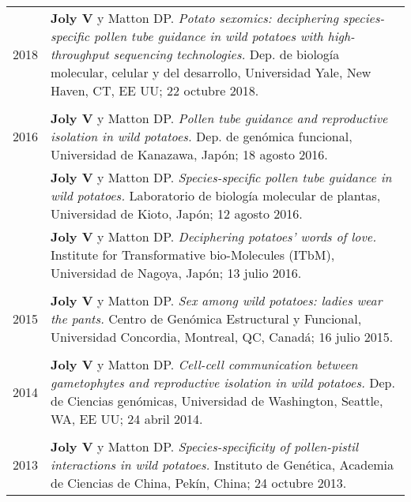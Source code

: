 \documentclass[letterpaper,12pt]{article}
\begin{document}
\begin{tabularx}{\textwidth}{@{}r|X@{}}

2018
& \textbf{Joly V} y Matton DP.
  \emph{Potato sexomics: deciphering species-specific pollen tube guidance in
  wild potatoes with high-throughput sequencing technologies.}
  Dep. de biología molecular, celular y del desarrollo,
  Universidad Yale, New Haven, CT, EE UU;
  22 octubre 2018.
  \\

\multicolumn{2}{c}{} \\

2016
& \textbf{Joly V} y Matton DP.
  \emph{Pollen tube guidance and reproductive isolation in wild potatoes.}
  Dep. de genómica funcional,
  Universidad de Kanazawa, Japón;
  18 agosto 2016.
  \vspace{1.5mm}
  \\

& \textbf{Joly V} y Matton DP.
  \emph{Species-specific pollen tube guidance in wild potatoes.}
  Laboratorio de biología molecular de plantas,
  Universidad de Kioto, Japón;
  12 agosto 2016.
  \vspace{1.5mm}
  \\

& \textbf{Joly V} y Matton DP.
  \emph{Deciphering potatoes’ words of love.}
  Institute for Transformative bio-Molecules (ITbM),
  Universidad de Nagoya, Japón;
  13 julio 2016.
  \\

\multicolumn{2}{c}{} \\

2015
& \textbf{Joly V} y Matton DP.
  \emph{Sex among wild potatoes: ladies wear the pants.}
  Centro de Genómica Estructural y Funcional,
  Universidad Concordia, Montreal, QC, Canadá;
  16 julio 2015.
  \\

\multicolumn{2}{c}{} \\

2014
& \textbf{Joly V} y Matton DP.
  \emph{Cell-cell communication between gametophytes and reproductive isolation
  in wild potatoes.}
  Dep. de Ciencias genómicas, Universidad de Washington, Seattle, WA, EE UU;
  24 abril 2014.
  \\

\multicolumn{2}{c}{} \\

2013
& \textbf{Joly V} y Matton DP.
  \emph{Species-specificity of pollen-pistil interactions in wild potatoes.}
  Instituto de Genética, Academia de Ciencias de China, Pekín, China;
  24 octubre 2013.
  \\

\end{tabularx}
\end{document}
